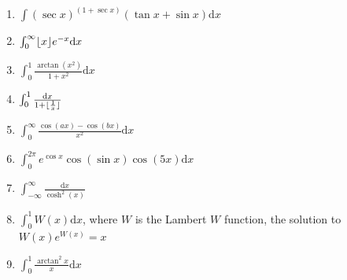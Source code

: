\documentclass[11pt, a4paper]{article}
\DeclarePairedDelimiter{\floor}{\lfloor}{\rfloor}
\newcommand{\dd}{\mathrm{d}}
\begin{document}
\begin{enumerate}
    \item $\int (\sec{x})^{(1+\sec{x})}(\tan{x}+\sin{x}) \dd x$ 
    \item $\int_0^{\infty} \floor{x}e^{-x} \dd x$
    \item $\int_0^1 \frac{\arctan(x^2)}{1+x^2} \dd x$ 
    \item $\int_0^1 \frac{\dd x}{1+\floor{\frac{1}{x}}}$ 
    \item $\int_0^{\infty} \frac{\cos(ax)-\cos(bx)}{x^2} \dd x$ 
    \item $\int_0^{2\pi} e^{\cos{x}}\cos(\sin{x})\cos(5x) \dd x$ 
    \item $\int_{-\infty}^{\infty} \frac{\dd x}{\cosh^2(x)}$ 
    \item $\int_0^1 W(x) \dd x$, where $W$ is the Lambert $W$ function, the solution to $W(x)e^{W(x)}=x$ 
    \item $\int_0^1 \frac{\arctan^2{x}}{x} \dd x$ 

\end{enumerate}
\end{document}
